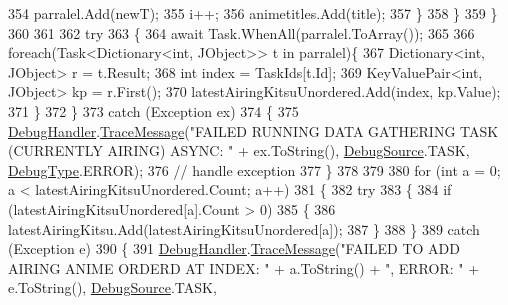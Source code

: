 \begin{DoxyCode}
354                         parralel.Add(newT);
355                         i++;
356                         animetitles.Add(title);
357                     \}
358                 \}
359             \}
360 
361 
362             \textcolor{keywordflow}{try}
363             \{
364                 await Task.WhenAll(parralel.ToArray());
365 
366                 \textcolor{keywordflow}{foreach}(Task<Dictionary<int, JObject>> t \textcolor{keywordflow}{in} parralel)\{
367                     Dictionary<int, JObject> r = t.Result;
368                     \textcolor{keywordtype}{int} index = TaskIds[t.Id];
369                     KeyValuePair<int, JObject> kp = r.First();
370                     latestAiringKitsuUnordered.Add(index, kp.Value);
371                 \}
372             \}
373             \textcolor{keywordflow}{catch} (Exception ex)
374             \{
375                 \mbox{\hyperlink{class_little_weeb_library_1_1_handlers_1_1_anime_profile_handler_a0b0ae3c3838d26351485e6dfc566a632}{DebugHandler}}.\mbox{\hyperlink{interface_little_weeb_library_1_1_handlers_1_1_i_debug_handler_a2e405bc3492e683cd3702fae125221bc}{TraceMessage}}(\textcolor{stringliteral}{"FAILED RUNNING DATA GATHERING TASK
       (CURRENTLY AIRING) ASYNC: "} + ex.ToString(), \mbox{\hyperlink{namespace_little_weeb_library_1_1_handlers_a2a6ca0775121c9c503d58aa254d292be}{DebugSource}}.TASK, \mbox{\hyperlink{namespace_little_weeb_library_1_1_handlers_ab66019ed40462876ec4e61bb3ccb0a62}{DebugType}}.ERROR);
376                 \textcolor{comment}{// handle exception}
377             \}
378 
379 
380             \textcolor{keywordflow}{for} (\textcolor{keywordtype}{int} a = 0; a < latestAiringKitsuUnordered.Count; a++)
381             \{
382                 \textcolor{keywordflow}{try}
383                 \{
384                     \textcolor{keywordflow}{if} (latestAiringKitsuUnordered[a].Count > 0)
385                     \{
386                         latestAiringKitsu.Add(latestAiringKitsuUnordered[a]);
387                     \}
388                 \}
389                 \textcolor{keywordflow}{catch} (Exception e)
390                 \{
391                     \mbox{\hyperlink{class_little_weeb_library_1_1_handlers_1_1_anime_profile_handler_a0b0ae3c3838d26351485e6dfc566a632}{DebugHandler}}.\mbox{\hyperlink{interface_little_weeb_library_1_1_handlers_1_1_i_debug_handler_a2e405bc3492e683cd3702fae125221bc}{TraceMessage}}(\textcolor{stringliteral}{"FAILED TO ADD AIRING ANIME ORDERD AT
       INDEX: "} + a.ToString() + \textcolor{stringliteral}{", ERROR: "} + e.ToString(), \mbox{\hyperlink{namespace_little_weeb_library_1_1_handlers_a2a6ca0775121c9c503d58aa254d292be}{DebugSource}}.TASK, 

\end{DoxyCode}
